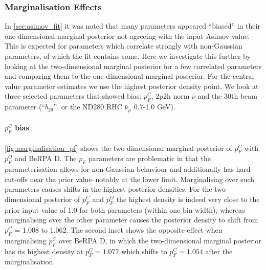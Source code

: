 \subsubsection{Marginalisation Effects}
\label{sec:marginalisation}
In \autoref{sec:asimov_fit} it was noted that many parameters appeared ``biased'' in their one-dimensional marginal posterior not agreeing with the input Asimov value. This is expected for parameters which correlate strongly with non-Gaussian parameters, of which the fit contains some. Here we investigate this further by looking at the two-dimensional marginal posterior for a few correlated parameters and comparing them to the one-dimensional marginal posterior. For the central value parameter estimates we use the highest posterior density point. We look at three selected parameters that showed bias: $p_F^{C}$, 2p2h norm $\bar{\nu}$ and the 30th beam parameter (``$b_29$'', or the ND280 RHC $\bar{\nu}_\mu$ 0.7-1.0 GeV).

\paragraph{$p_F^C$ bias}
\autoref{fig:marginalisation_pf} shows the two dimensional marginal posterior of $p_F^C$ with $p_F^O$ and BeRPA D. The $p_F$ parameters are problematic in that the parameterisation  allows for non-Gaussian behaviour and additionally has hard cut-offs near the prior value--notably at the lower limit. Marginalising over such parameters causes shifts in the highest posterior densities. For the two-dimensional posterior of $p_F^C$ and $p_F^O$ the highest density is indeed very close to the prior input value of 1.0 for both parameters (within one bin-width), whereas marginalising over the other parameter causes the posterior density to shift from $p_F^{C}$ = 1.008 to 1.062. The second inset shows the opposite effect when marginalising $p_F^{C}$ over BeRPA D, in which the two-dimensional marginal posterior has its highest density at $p_F^{C} = 1.077$ which shifts to $p_F^{C} = 1.054$ after the marginalisation.

